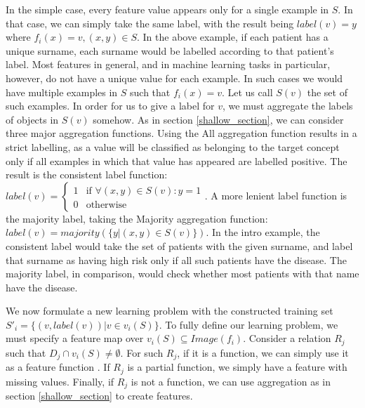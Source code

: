 \documentclass[twoside,11pt]{article}
\theoremstyle{definition}
\begin{document}
In the simple case, every feature value appears only for a single example in $S$. In that case, we can simply take the same label, with the result being $label(v)=y$ where $f_i(x)=v,(x,y)\in S$. In the above example, if each patient has a unique surname, each surname would be labelled according to that patient's label.
Most features in general, and in machine learning tasks in particular, however, do not have a unique value for each example. In such cases we would have multiple examples in $S$ such that $f_i(x)=v$. Let us call $S(v)$ the set of such examples. In order for us to give a label for $v$, we must aggregate the labels of objects in $S(v)$ somehow. As in section \ref{shallow_section}, we can consider three major aggregation functions.
Using the All aggregation function results in a strict labelling, as a value will be classified as belonging to the target concept only if all examples in which that value has appeared are labelled positive. The result is the consistent label function: $label(v)=\begin{cases} 1 &\mbox{if } \forall (x,y)\in S(v): y=1\\ 
0 & \mbox{otherwise } \end{cases}$.
 A more lenient label function is the majority label, taking the Majority aggregation function: $label(v)=majority(\{y|(x,y)\in S(v)\})$.
 In the intro example, the consistent label would take the set of patients with the given surname, and label that surname as having high risk only if all such patients have the disease. The majority label, in comparison, would check whether most patients with that name have the disease.
 
We now formulate a new learning problem with the constructed training set
$S'_i = \{ (v, label(v)) | v \in v_i(S) \}$.
To fully define our learning problem, we must specify a feature map over $v_i(S)\subseteq Image(f_i)$. Consider a relation $R_j$ such that $D_j\cap v_i(S)\neq \emptyset$. For such $R_j$, if it is a function, we can simply use it as a feature function%
. If $R_j$ is a partial function, we simply have a feature with missing values. Finally, if $R_j$ is not a function, we can use aggregation as in section \ref{shallow_section} to create features.
\end{document}
